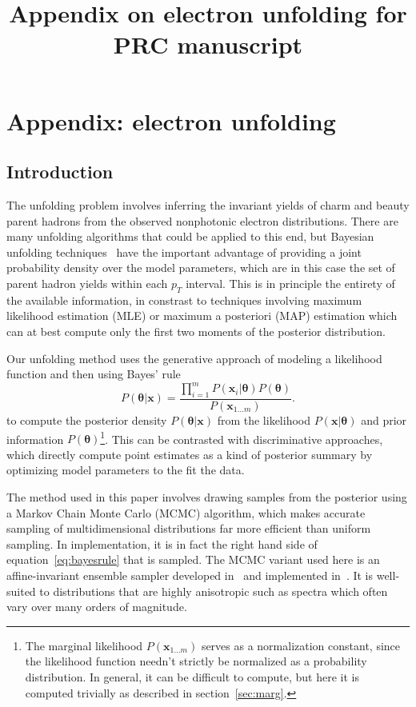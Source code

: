 \documentclass[12pt]{article}
\title{\sffamily\bfseries{Appendix on electron unfolding for PRC manuscript}}
\author{\sffamily{Andrew Adare}}
\date{\sffamily{\today}}
\newcommand{\pt}{p_T}
\newcommand{\xvec}{\mathbf{x}}
\newcommand{\thetavec}{\mathbf{\theta}}
\newcommand{\prior}{P(\thetavec)}
\newcommand{\post}{P(\thetavec|\xvec)}
\newcommand{\like}{P(\xvec|\thetavec)}
\newcommand{\ilike}{P(\xvec_i|\thetavec)}
\begin{document}
\maketitle

\section{Appendix: electron unfolding}

\subsection{Introduction}
The unfolding problem involves inferring the invariant yields of charm and beauty parent hadrons from the observed nonphotonic electron distributions. There are many unfolding algorithms that could be applied to this end, but Bayesian unfolding techniques~\cite{Choudalakis:2012hz} have the important advantage of providing a joint probability density over the model parameters, which are in this case the set of parent hadron yields within each $\pt$ interval. This is in principle the entirety of the available information, in constrast to techniques involving maximum likelihood estimation (MLE) or maximum a posteriori (MAP) estimation which can at best compute only the first two moments of the posterior distribution.

Our unfolding method uses the generative approach of modeling a likelihood function and then using Bayes' rule 
\begin{equation}\label{eq:bayesrule}
  \post = \frac{\prod_{i=1}^m \ilike \prior}{P(\xvec_{1\ldots m})}.
\end{equation}
to compute the posterior density $\post$ from the likelihood $\like$ and prior information $\prior$\footnote{The marginal likelihood $P(\xvec_{1\ldots m})$ serves as a normalization constant, since the likelihood function needn't strictly be normalized as a probability distribution. In general, it can be difficult to compute, but here it is computed trivially as described in section~\ref{sec:marg}.}. This can be contrasted with discriminative approaches, which directly compute point estimates as a kind of posterior summary by optimizing model parameters to the fit the data.

The method used in this paper involves drawing samples from the posterior using a Markov Chain Monte Carlo (MCMC) algorithm, which makes accurate sampling of multidimensional distributions far more efficient than uniform sampling. In implementation, it is in fact the right hand side of equation~\ref{eq:bayesrule} that is sampled. The MCMC variant used here is an affine-invariant ensemble sampler developed in~\cite{goodman2010} and implemented in~\cite{dfm2013}. It is well-suited to distributions that are highly anisotropic such as spectra which often vary over many orders of magnitude.
\end{document}
